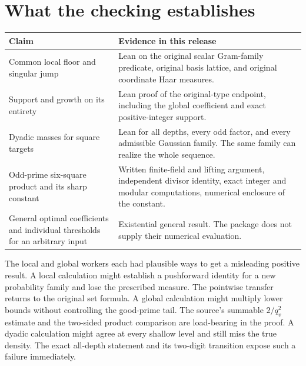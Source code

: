 \documentclass[12pt,letterpaper]{article}
\begin{document}
\section{What the checking establishes}
\begin{center}\small\begin{tabularx}{\linewidth}{@{}p{.25\linewidth}Y@{}}\toprule
Claim & Evidence in this release\\\midrule
Common local floor and singular jump & Lean on the original scalar Gram-family predicate, original basis lattice, and original coordinate Haar measures.\\
Support and growth on its entirety & Lean proof of the original-type endpoint, including the global coefficient and exact positive-integer support.\\
Dyadic masses for square targets & Lean for all depths, every odd factor, and every admissible Gaussian family. The same family can realize the whole sequence.\\
Odd-prime six-square product and its sharp constant & Written finite-field and lifting argument, independent divisor identity, exact integer and modular computations, numerical enclosure of the constant.\\
General optimal coefficients and individual thresholds for an arbitrary input & Existential general result. The package does not supply their numerical evaluation.\\\bottomrule\end{tabularx}\end{center}
The local and global workers each had plausible ways to get a misleading positive result. A local calculation might establish a pushforward identity for a new probability family and lose the prescribed measure. The pointwise transfer returns to the original set formula. A global calculation might multiply lower bounds without controlling the good-prime tail. The source's summable $2/q_v^2$ estimate and the two-sided product comparison are load-bearing in the proof. A dyadic calculation might agree at every shallow level and still miss the true density. The exact all-depth statement and its two-digit transition expose such a failure immediately.
\end{document}
